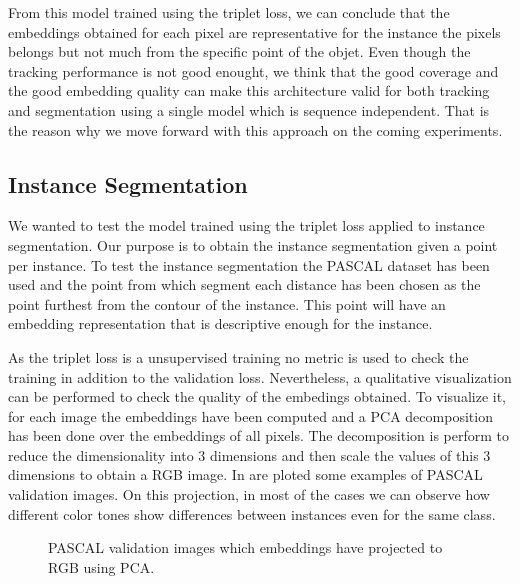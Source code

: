 From this model trained using the triplet loss, we can conclude that the embeddings obtained for each pixel are representative for the instance the pixels belongs but not much from the specific point of the objet.
Even though the tracking performance is not good enought, we think that the good coverage and the good embedding quality can make this architecture valid for both tracking and segmentation using a single model which is sequence independent.
That is the reason why we move forward with this approach on the coming experiments.



\subsection{Instance Segmentation}

We wanted to test the model trained using the triplet loss applied to instance segmentation.
Our purpose is to obtain the instance segmentation given a point per instance.
To test the instance segmentation the PASCAL dataset has been used and the point from which segment each distance has been chosen as the point furthest from the contour of the instance.
This point will have an embedding representation that is descriptive enough for the instance.

As the triplet loss is a unsupervised training no metric is used to check the training in addition to the validation loss.
Nevertheless, a qualitative visualization can be performed to check the quality of the embedings obtained.
To visualize it, for each image the embeddings have been computed and a PCA decomposition has been done over the embeddings of all pixels.
The decomposition is perform to reduce the dimensionality into 3 dimensions and then scale the values of this 3 dimensions to obtain a RGB image.
In  are ploted some examples of PASCAL validation images.
On this projection, in most of the cases we can observe how different color tones show differences between instances even for the same class.

\begin{figure}[h]
  \centering
  \caption{PASCAL validation images which embeddings have projected to RGB using PCA. }
  \label{fig:pca_embeddings}
\end{figure}

